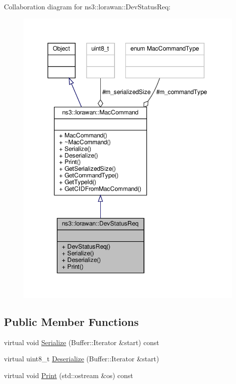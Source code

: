 Collaboration diagram for ns3\+:\+:lorawan\+:\+:Dev\+Status\+Req\+:
\nopagebreak
\begin{figure}[H]
\begin{center}
\leavevmode
\includegraphics[width=343pt]{classns3_1_1lorawan_1_1DevStatusReq__coll__graph}
\end{center}
\end{figure}
\subsection*{Public Member Functions}
\begin{DoxyCompactItemize}
\item 
virtual void \hyperlink{classns3_1_1lorawan_1_1DevStatusReq_a98693e79ac85f1bf19980cc189ba27f6}{Serialize} (Buffer\+::\+Iterator \&start) const
\item 
virtual uint8\+\_\+t \hyperlink{classns3_1_1lorawan_1_1DevStatusReq_a6802f5824758e56ebe7317ba4a6d50b6}{Deserialize} (Buffer\+::\+Iterator \&start)
\item 
virtual void \hyperlink{classns3_1_1lorawan_1_1DevStatusReq_ad550f7d8f599f48d54dea36d87ab4ab9}{Print} (std\+::ostream \&os) const
\end{DoxyCompactItemize}

